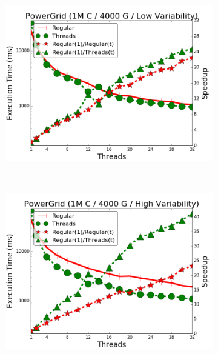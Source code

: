 \begin{figure}[]
        \begin{subfigure}[b]{\plotsize\textwidth}
           \includegraphics[width=\textwidth]{experiments/threads/cmp-powergrid-1M4000C-low.png}
           \mycap{}
           \label{fig:threads:powergrid3}
        \end{subfigure} ~
        \begin{subfigure}[b]{\plotsize\textwidth}
           \includegraphics[width=\textwidth]{experiments/threads/cmp-powergrid-1M4000C-high.png}
           \mycap{}
           \label{fig:threads:powergrid4}
        \end{subfigure} \\
        \label{fig:threads:results_powergrid}
\end{figure}


